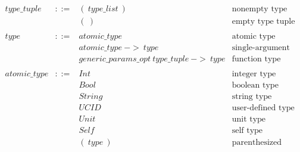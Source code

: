 $$\begin{array}{llll}
\\
type\_tuple & ::= & (\ type\_list\ ) & \text{nonempty type tuple} \\
            &     & (\ )            & \text{empty type tuple}    \\
\\
type & ::= & atomic\_type & \text{atomic type} \\
     &     & atomic\_type\ ->\ type & \text{single-argument function type} \\
     &     & generic\_params\_opt\ type\_tuple\ ->\ type & \text{function type} \\
\\
atomic\_type & ::= & Int        & \text{integer type}       \\
             &     & Bool       & \text{boolean type}       \\
             &     & String     & \text{string type}        \\
             &     & UCID       & \text{user-defined type}  \\
             &     & Unit       & \text{unit type}          \\
             &     & Self       & \text{self type}          \\
             &     & (\ type\ ) & \text{parenthesized type} \\
\end{array}
$$
